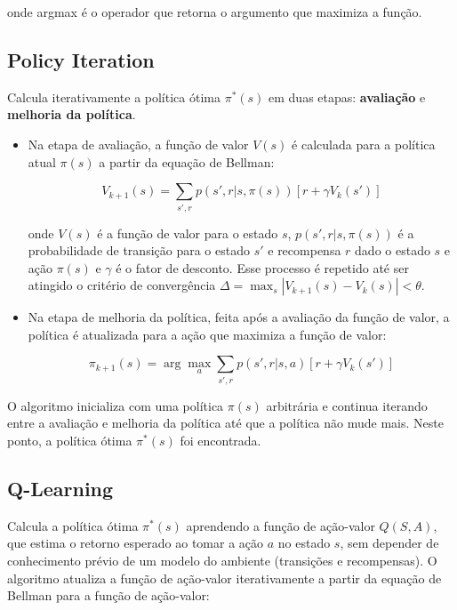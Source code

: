 onde argmax é o operador que retorna o argumento que maximiza a função.

\subsection*{Policy Iteration}
Calcula iterativamente a política ótima $\pi^*(s)$ em duas etapas: \textbf{avaliação} e \textbf{melhoria da política}. 

\begin{itemize}
    \item Na etapa de avaliação, a função de valor $V(s)$ é calculada para a política atual $\pi(s)$ a partir da equação de Bellman:

    \begin{equation}
        V_{k+1}(s) = \sum_{s', r} p(s', r | s, \pi(s)) [r + \gamma V_{k}(s')]
    \end{equation}
    
    onde $V(s)$ é a função de valor para o estado $s$, $p(s', r | s, \pi(s))$ é a probabilidade de transição para o estado $s'$ e recompensa $r$ dado o estado $s$ e ação $\pi(s)$ e $\gamma$ é o fator de desconto. Esse processo é repetido até ser atingido o critério de convergência $\Delta = \max_s |V_{k+1}(s) - V_k(s)| < \theta$.

    \item Na etapa de melhoria da política, feita após a avaliação da função de valor, a política é atualizada para a ação que maximiza a função de valor:

    \begin{equation}
        \pi_{k+1}(s) = \arg\max_a \sum_{s', r} p(s', r | s, a) [r + \gamma V_{k}(s')]
    \end{equation}
\end{itemize}

O algoritmo inicializa com uma política $\pi(s)$ arbitrária e continua iterando entre a avaliação e melhoria da política até que a política não mude mais. Neste ponto, a política ótima $\pi^*(s)$ foi encontrada.

\subsection*{Q-Learning}

Calcula a política ótima $\pi^*(s)$ aprendendo a função de ação-valor $Q(S, A)$, que estima o retorno esperado ao tomar a ação $a$ no estado $s$, sem depender de conhecimento prévio de um modelo do ambiente (transições e recompensas). O algoritmo atualiza a função de ação-valor iterativamente a partir da equação de Bellman para a função de ação-valor:

